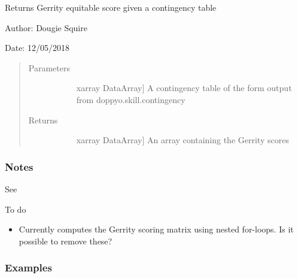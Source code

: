 \documentclass[letterpaper,10pt,english]{sphinxmanual}
\begin{document}

\begin{fulllineitems}
\label{\detokenize{skill_doc:skill.Gerrity_score}}
Returns Gerrity equitable score given a contingency table

\begin{DUlineblock}{0em}
\item[] Author: Dougie Squire
\item[] Date: 12/05/2018
\end{DUlineblock}
\begin{quote}\begin{description}
\item[{Parameters}] \leavevmode\begin{description}
\item[{}] \leavevmode{[}xarray DataArray{]}
A contingency table of the form output from doppyo.skill.contingency

\end{description}

\item[{Returns}] \leavevmode\begin{description}
\item[{}] \leavevmode{[}xarray DataArray{]}
An array containing the Gerrity scores

\end{description}

\end{description}\end{quote}
\subsubsection*{Notes}

See 

To do
\begin{itemize}
\item {} 
Currently computes the Gerrity scoring matrix using nested for-loops. Is it possible                 to remove these?

\end{itemize}
\subsubsection*{Examples}


\end{fulllineitems}
\end{document}
